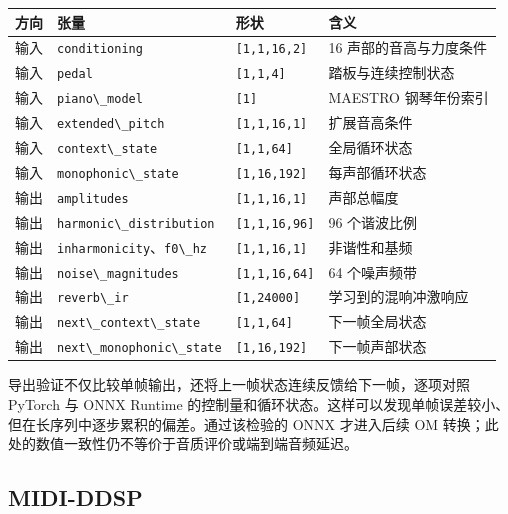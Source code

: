 \begin{longtable}[]{@{}llll@{}}
\toprule\noalign{}
方向 & 张量 & 形状 & 含义 \\
\midrule\noalign{}
\endhead
\bottomrule\noalign{}
\endlastfoot
输入 & \passthrough{\lstinline!conditioning!} &
\passthrough{\lstinline![1,1,16,2]!} & 16 声部的音高与力度条件 \\
输入 & \passthrough{\lstinline!pedal!} &
\passthrough{\lstinline![1,1,4]!} & 踏板与连续控制状态 \\
输入 & \passthrough{\lstinline!piano\_model!} &
\passthrough{\lstinline![1]!} & MAESTRO 钢琴年份索引 \\
输入 & \passthrough{\lstinline!extended\_pitch!} &
\passthrough{\lstinline![1,1,16,1]!} & 扩展音高条件 \\
输入 & \passthrough{\lstinline!context\_state!} &
\passthrough{\lstinline![1,1,64]!} & 全局循环状态 \\
输入 & \passthrough{\lstinline!monophonic\_state!} &
\passthrough{\lstinline![1,16,192]!} & 每声部循环状态 \\
输出 & \passthrough{\lstinline!amplitudes!} &
\passthrough{\lstinline![1,1,16,1]!} & 声部总幅度 \\
输出 & \passthrough{\lstinline!harmonic\_distribution!} &
\passthrough{\lstinline![1,1,16,96]!} & 96 个谐波比例 \\
输出 &
\passthrough{\lstinline!inharmonicity!}、\passthrough{\lstinline!f0\_hz!}
& \passthrough{\lstinline![1,1,16,1]!} & 非谐性和基频 \\
输出 & \passthrough{\lstinline!noise\_magnitudes!} &
\passthrough{\lstinline![1,1,16,64]!} & 64 个噪声频带 \\
输出 & \passthrough{\lstinline!reverb\_ir!} &
\passthrough{\lstinline![1,24000]!} & 学习到的混响冲激响应 \\
输出 & \passthrough{\lstinline!next\_context\_state!} &
\passthrough{\lstinline![1,1,64]!} & 下一帧全局状态 \\
输出 & \passthrough{\lstinline!next\_monophonic\_state!} &
\passthrough{\lstinline![1,16,192]!} & 下一帧声部状态 \\
\end{longtable}

导出验证不仅比较单帧输出，还将上一帧状态连续反馈给下一帧，逐项对照
PyTorch 与 ONNX Runtime
的控制量和循环状态。这样可以发现单帧误差较小、但在长序列中逐步累积的偏差。通过该检验的
ONNX 才进入后续 OM
转换；此处的数值一致性仍不等价于音质评价或端到端音频延迟。

\subsection{MIDI-DDSP}\label{src-experiment-case3-midi-ddsp}

